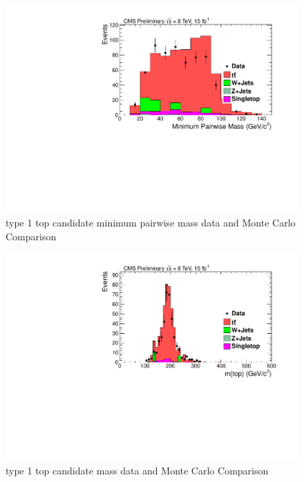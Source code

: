 \begin{figure}[htcb]
\centering
\includegraphics[width=1.0\textwidth]{figs/semiLepMass_t1MinimumPairwiseMass.pdf}
\caption{type 1 top candidate minimum pairwise mass data and Monte Carlo Comparison}
\label{figs:semiLepMass_t1MinimumPairwiseMass}
\end{figure}
\clearpage

\begin{figure}[htcb]
\centering
\includegraphics[width=1.0\textwidth]{figs/semiLepMass_t1TopMass.pdf}
\caption{type 1 top candidate mass data and Monte Carlo Comparison}
\label{figs:semiLepMass_t1massprecut}
\end{figure}
\clearpage
